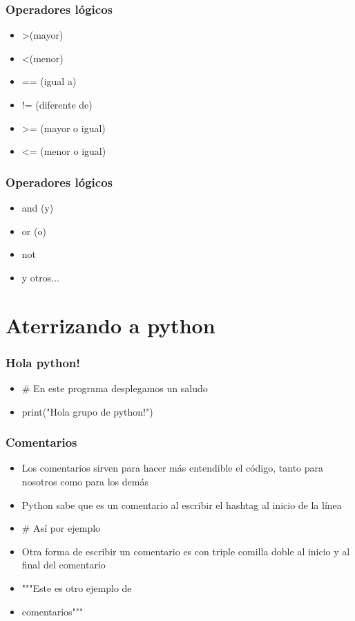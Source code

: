 \documentclass[hyperref={pdfpagelabels=false},xcolor=pst,pdf,fragile]{beamer}
\begin{document}
\begin{frame}
    \frametitle{Operadores lógicos}
    \pause
    \begin{itemize}
    \item \textgreater (mayor)
    \item \textless (menor)
    \item == (igual a)
    \item != (diferente de)
    \item \textgreater= (mayor o igual)
    \item \textless= (menor o igual)
    \end{itemize}
\end{frame}

\begin{frame}
    \frametitle{Operadores lógicos}
    \begin{itemize}
    \item and (y)
    \item or (o)
    \item not
    \item y otros...
    \end{itemize}
\end{frame}

\section{Aterrizando a python}
\begin{frame}
    \frametitle{Hola python!}
    \pause
    \begin{itemize}
    \item \# En este programa desplegamos un saludo
    \item print("Hola grupo de python!")
    \end{itemize}
\end{frame}

\begin{frame}
    \frametitle{Comentarios}
    \pause
    \begin{itemize}
    \item Los comentarios sirven para hacer más entendible el código, tanto para nosotros como para los demás
    \item Python sabe que es un comentario al escribir el hashtag al inicio de la línea
    \item \# Así por ejemplo
    \item Otra forma de escribir un comentario es con triple comilla doble al inicio y al final del comentario
    \item """Este es otro ejemplo de 
    \item comentarios"""
    \end{itemize}
\end{frame}
\end{document}
